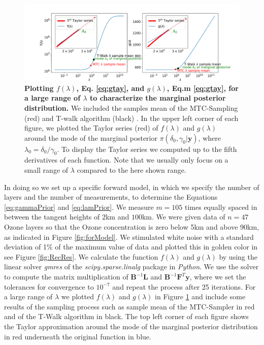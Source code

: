 \begin{figure}[htb]
\centering
\includegraphics[width=1\textwidth]{f_and_g.png} 
\caption[Plotting $f(\lambda)$ and $g(\lambda)$ for a large range of $\lambda$ to characterize the marginal posterior distribution.]{\textbf{Plotting $f(\lambda)$, Eq. \ref{eq:gtay}, and $g(\lambda)$, Eq.m \ref{eq:gtay}, for a large range of $\lambda$ to characterize the marginal posterior distribution.}
We included the samples mean of the MTC-Sampling (red) and T-walk algorithm (black) \cite{}. In the upper left corner of each figure, we plotted the Taylor series (red) of $f(\lambda)$ and $g(\lambda)$ around the mode of the marginal posterior $\pi(\delta_0, \gamma_0 | \bm{y})$, where $\lambda_0 = \delta_0 / \gamma_0 $. To display the Taylor series we computed up to the fifth derivatives of each function. Note that we usually only focus on a small range of $\lambda$ compared to the here shown range.}
\label{fig:fandg}
\end{figure}
In doing so we set up a specific forward model, in which we specify the number of layers and the number of measurements, to determine the Equations \ref{eq:gammaPrior} and \ref{eq:lamPrior}.
We measure $m = 105$ times equally spaced in between the tangent heights of $2$km and $100$km.
We were given data of $n = 47$ Ozone layers so that the Ozone concentration is zero below 5km and above 90km, as indicated in Figure \ref{fig:forModel}.
We stimulated white noise with a standard deviation of 1\% of the maximum value of data and plotted this in golden color in see Figure \ref{fig:RecRes}.
We calculate the function $f(\lambda)$ and $g(\lambda)$ by using the linear solver \textit{gmres} of the \textit{scipy.sparse.linalg} package in \textit{Python}.
We use the solver to compute the matrix multiplication of $\bm{B}^{-1}\bm{L}$ and $\bm{B}^{-1} \bm{F}^T \bm{y}$, where we set the tolerances for convergence to $10^{-7}$ and repeat the process after 25 iterations.
For a large range of $\lambda$ we plotted $f(\lambda)$ and $g(\lambda)$ in Figure \ref{fig:fandg} and include some results of the sampling process such as sample mean of the MTC-Sampler in red and of the T-Walk algorithm in black.
The top left corner of each figure shows the Taylor approximation around the mode of the marginal posterior distribution in red underneath the original function in blue.

